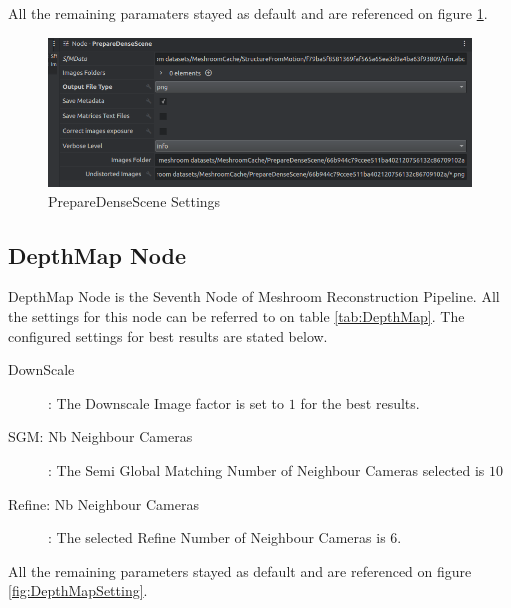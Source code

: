 \documentclass[12pt]{report}
\begin{document}
All the remaining paramaters stayed as default and are referenced on figure \ref{fig:PrepareDepthSense}.
\begin{figure}[H]%
  \centering
 \includegraphics[width=1\textwidth]{PrepareDenseScene.png}
\caption{PrepareDenseScene Settings}
\label{fig:PrepareDepthSense} 
\end{figure}




\subsection*{DepthMap Node}
DepthMap Node is the Seventh Node of Meshroom Reconstruction Pipeline.  All the settings for this node can be referred to on table \ref{tab:DepthMap}.
The configured settings for best results are stated below. 

\begin{description}
  \item[DownScale]: The Downscale Image factor is set to $1$ for the best results.
  \item[SGM: Nb Neighbour Cameras] : The  Semi Global Matching Number of Neighbour Cameras selected is $10$
  \item[Refine: Nb Neighbour Cameras]: The selected Refine Number of Neighbour Cameras is $6$.    
\end{description}

All the remaining parameters stayed as default and are referenced on figure \ref{fig:DepthMapSetting}.
\end{document}
